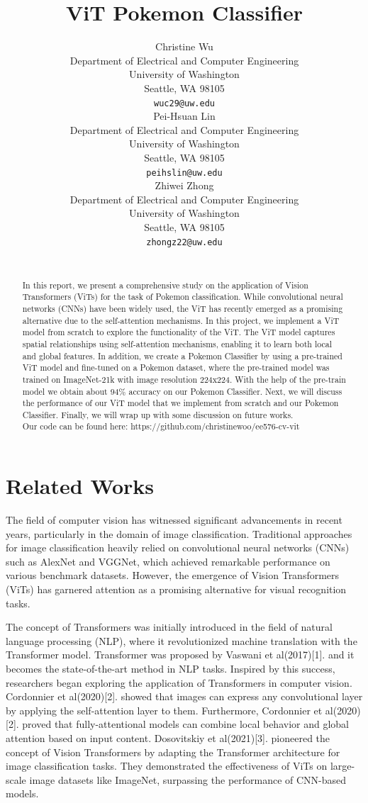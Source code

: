 \documentclass{article} %
\title{ViT Pokemon Classifier}
\author{
Christine Wu\\
Department of Electrical and Computer Engineering\\
University of Washington\\
Seattle, WA 98105 \\
\texttt{wuc29@uw.edu} \\
\And
Pei-Hsuan Lin \\
Department of Electrical and Computer Engineering\\
University of Washington\\
Seattle, WA 98105 \\
\texttt{peihslin@uw.edu} \\
\AND
Zhiwei Zhong \\
Department of Electrical and Computer Engineering\\
University of Washington\\
Seattle, WA 98105 \\
\texttt{zhongz22@uw.edu} \\
\\
}
\begin{document}
\maketitle

\begin{abstract}
In this report, we present a comprehensive study on the application of Vision Transformers 
(ViTs) for the task of Pokemon classification. While convolutional neural networks (CNNs) 
have been widely used, the ViT has recently emerged as a promising alternative due to the 
self-attention mechanisms. In this project, we implement a ViT model from scratch to explore
the functionality of the ViT. The ViT model captures spatial relationships using 
self-attention mechanisms, enabling it to learn both local and global features. 
In addition, we create a Pokemon Classifier by using a pre-trained ViT model and fine-tuned on
a Pokemon dataset, where the pre-trained model was trained on ImageNet-21k with image resolution 224x224. 
With the help of the pre-train model we obtain about $94\%$ accuracy on our Pokemon Classifier. Next, 
we will discuss the performance of our ViT model that we implement from scratch and our Pokemon Classifier.
Finally, we will wrap up with some discussion on future works. \\
Our code can be found here: https://github.com/christinewoo/ee576-cv-vit
\end{abstract}

\section{Related Works}
The field of computer vision has witnessed significant advancements in recent years, 
particularly in the domain of image classification. Traditional approaches for image 
classification heavily relied on convolutional neural networks (CNNs) such as AlexNet 
and VGGNet, which achieved remarkable performance on various benchmark datasets. However, 
the emergence of Vision Transformers (ViTs) has garnered attention as a promising 
alternative for visual recognition tasks.

The concept of Transformers was initially introduced in the field of natural language 
processing (NLP), where it revolutionized machine translation with the Transformer model. 
Transformer was proposed by Vaswani et al(2017)[1]. and it becomes the state-of-the-art 
method in NLP tasks. Inspired by this success, researchers began exploring the application 
of Transformers in computer vision. Cordonnier et al(2020)[2]. showed that images can express 
any convolutional layer by applying the self-attention layer to them. Furthermore, 
Cordonnier et al(2020)[2]. proved that fully-attentional models can combine local behavior 
and global attention based on input content. Dosovitskiy et al(2021)[3]. pioneered the 
concept of Vision Transformers by adapting the Transformer architecture for image 
classification tasks. They demonstrated the effectiveness of ViTs on large-scale image 
datasets like ImageNet, surpassing the performance of CNN-based models.
\end{document}
